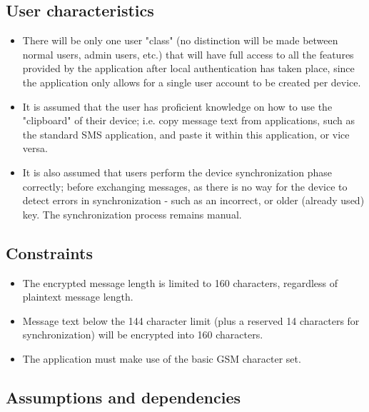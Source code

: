 \subsection{User characteristics}
\begin{itemize}
\item There will be only one user "class" (no distinction will be made between normal users, admin users, etc.) that will have full access to all the features provided by the application after local authentication has taken place, since the application only allows for a single user account to be created per device.
\item It is assumed that the user has proficient knowledge on how to use the "clipboard" of their device; i.e. copy message text from applications, such as the standard SMS application, and paste it within this application, or vice versa.
\item It is also assumed that users perform the device synchronization phase correctly; before exchanging messages, as there is no way for the device to detect errors in synchronization - such as an incorrect, or older (already used) key. The synchronization process remains manual.
\end{itemize}

\subsection{Constraints}
\begin{itemize}
\item The encrypted message length is limited to 160 characters, regardless of plaintext message length.
\item Message text below the 144 character limit (plus a reserved 14 characters for synchronization) will be encrypted into 160 characters.
\item The application must make use of the basic GSM character set.
\end{itemize}

\subsection{Assumptions and dependencies}

